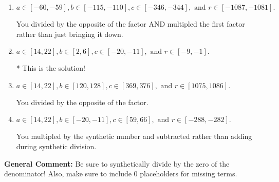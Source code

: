\documentclass{extbook}[14pt]
\begin{document}
\begin{enumerate}
{\begin{enumerate}[label=\Alph*.]
 You multipled by the synthetic number rather than bringing the first factor down.
\item \( a \in [-60, -59], b \in [-115, -110], c \in [-346, -344], \text{ and } r \in [-1087, -1081]. \)

 You divided by the opposite of the factor AND multipled the first factor rather than just bringing it down.
\item \( a \in [14, 22], b \in [2, 6], c \in [-20, -11], \text{ and } r \in [-9, -1]. \)

* This is the solution!
\item \( a \in [14, 22], b \in [120, 128], c \in [369, 376], \text{ and } r \in [1075, 1086]. \)

 You divided by the opposite of the factor.
\item \( a \in [14, 22], b \in [-20, -11], c \in [59, 66], \text{ and } r \in [-288, -282]. \)

 You multipled by the synthetic number and subtracted rather than adding during synthetic division.
\end{enumerate}

\textbf{General Comment:} Be sure to synthetically divide by the zero of the denominator! Also, make sure to include 0 placeholders for missing terms.
}
\end{enumerate}
\end{document}
